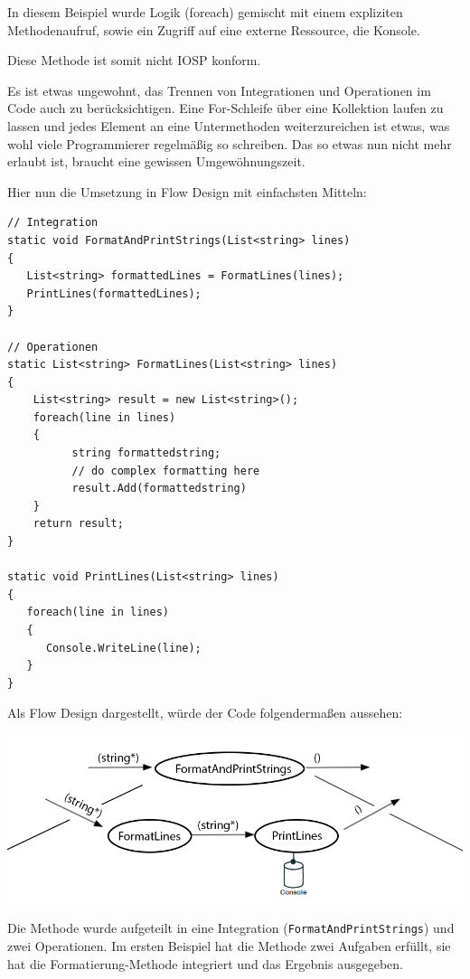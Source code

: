 In diesem Beispiel wurde Logik (foreach) gemischt mit einem expliziten
Methodenaufruf, sowie ein Zugriff auf eine externe Ressource, die
Konsole.

Diese Methode ist somit nicht IOSP konform.

Es ist etwas ungewohnt, das Trennen von Integrationen und Operationen im Code auch zu berücksichtigen.
Eine For-Schleife über eine Kollektion laufen zu lassen und jedes Element an eine Untermethoden weiterzureichen ist etwas,
was wohl viele Programmierer regelmäßig so schreiben.
Das so etwas nun nicht mehr erlaubt ist, braucht eine gewissen Umgewöhnungszeit.

\bigskip

Hier nun die Umsetzung in Flow Design mit einfachsten Mitteln:

\begin{lstlisting}[caption=FormatAndPrintStrings Variante 1]
// Integration
static void FormatAndPrintStrings(List<string> lines)
{
   List<string> formattedLines = FormatLines(lines);
   PrintLines(formattedLines);
}

// Operationen
static List<string> FormatLines(List<string> lines)
{
    List<string> result = new List<string>();
    foreach(line in lines)
    {
          string formattedstring;
          // do complex formatting here
          result.Add(formattedstring)
    }
    return result;
}

static void PrintLines(List<string> lines)
{
   foreach(line in lines)
   {
      Console.WriteLine(line);
   }
}
\end{lstlisting}

\pagebreak

Als Flow Design dargestellt, würde der Code folgendermaßen aussehen:

\begin{center}
	\includegraphics[width=1\linewidth]{./img/flowForeach1.png}
\end{center}

Die Methode wurde aufgeteilt in eine Integration (\texttt{FormatAndPrintStrings}) und zwei Operationen.
Im ersten Beispiel hat die Methode zwei Aufgaben erfüllt, sie hat die Formatierung-Methode integriert und
das Ergebnis ausgegeben.

